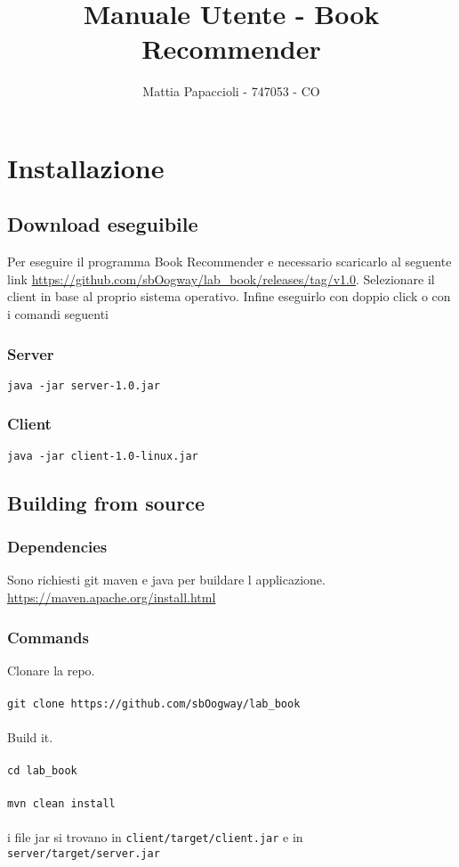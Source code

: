 \documentclass{report}
\title{Manuale Utente - Book Recommender}
\author{Mattia Papaccioli - 747053 - CO}
\begin{document}
\maketitle

\tableofcontents

\chapter{Installazione}
\section{Download eseguibile}
Per eseguire il programma Book Recommender e necessario scaricarlo al seguente link \url{https://github.com/sbOogway/lab_book/releases/tag/v1.0}. 
Selezionare il client in base al proprio sistema operativo. 
Infine eseguirlo con doppio click o con i comandi seguenti

\subsection{Server}
\texttt{java -jar server-1.0.jar}

\subsection{Client}
\texttt{java -jar client-1.0-linux.jar}


\section{Building from source}
\subsection{Dependencies}
Sono richiesti git maven e java per buildare l applicazione.
\url{https://maven.apache.org/install.html}
\subsection{Commands}
Clonare la repo. \\ \\
\verb+git clone https://github.com/sbOogway/lab_book+ \\ \\
Build it. \\ \\
\verb+cd lab_book+ \\ \\
\verb+mvn clean install+ \\ \\
i file jar si trovano in \verb+client/target/client.jar+ e in \verb+server/target/server.jar+
\end{document}
